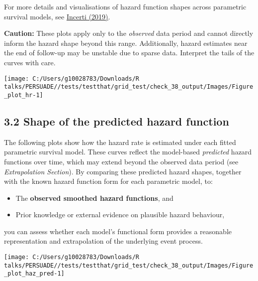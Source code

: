 \documentclass[
]{article}
\providecommand{\tightlist}{%
  \setlength{\itemsep}{0pt}\setlength{\parskip}{0pt}}
\begin{document}
For more details and visualisations of hazard function shapes across
parametric survival models, see
\href{https://devinincerti.com/2019/06/18/parametric_survival.html}{Incerti
(2019)}.

\textbf{Caution:} These plots apply only to the \emph{observed} data
period and cannot directly inform the hazard shape beyond this range.
Additionally, hazard estimates near the end of follow-up may be unstable
due to sparse data. Interpret the tails of the curves with care.

\clearpage

\begin{flushleft}\texttt{[image: C:/Users/g10028783/Downloads/R talks/PERSUADE//tests/testthat/grid\_test/check\_38\_output/Images/Figure\_plot\_hr-1]} \end{flushleft}

\clearpage

\subsection{3.2 Shape of the predicted hazard
function}\label{shape-of-the-predicted-hazard-function}

The following plots show how the hazard rate is estimated under each
fitted parametric survival model. These curves reflect the model-based
\emph{predicted} hazard functions over time, which may extend beyond the
observed data period (see \emph{Extrapolation Section}). By comparing
these predicted hazard shapes, together with the known hazard function
form for each parametric model, to:

\begin{itemize}
\tightlist
\item
  The \textbf{observed smoothed hazard functions}, and\\
\item
  Prior knowledge or external evidence on plausible hazard behaviour,
\end{itemize}

you can assess whether each model's functional form provides a
reasonable representation and extrapolation of the underlying event
process.

\clearpage

\begin{flushleft}\texttt{[image: C:/Users/g10028783/Downloads/R talks/PERSUADE//tests/testthat/grid\_test/check\_38\_output/Images/Figure\_plot\_haz\_pred-1]} \end{flushleft}
\end{document}
